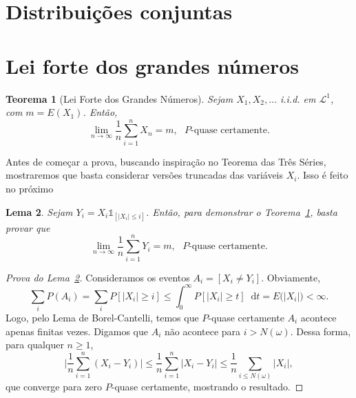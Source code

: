 \documentclass[reqno]{article}
\newcommand*\1{\mathds{1}}
\newtheorem{theorem}{Teorema}[section]
\newtheorem{lemma}[theorem]{Lema}
\renewcommand*\d{\mathop{}\!\mathrm{d}}
\begin{document}
\newpage

\section{Distribuições conjuntas}

\newpage

\section{Lei forte dos grandes números}

\begin{theorem}[Lei Forte dos Grandes Números]
  \label{t:LFGN}
  Sejam $X_1, X_2, \dots$ i.i.d. em $\mathcal{L}^1$, com $m = E(X_1)$.
  Então,
  \begin{equation}
    \lim_{n \to \infty} \frac{1}{n} \sum_{i=1}^n X_n = m, \text{ $P$-quase certamente.}
  \end{equation}
\end{theorem}

Antes de começar a prova, buscando inspiração no Teorema das Três Séries, mostraremos que basta considerar versões truncadas das variáveis $X_i$.
Isso é feito no próximo

\begin{lemma}
  \label{l:LFGN}
  Sejam $Y_i = X_i \1_{[|X_i| \leq i]}$.
  Então, para demonstrar o Teorema~\ref{t:LFGN}, basta provar que
  \begin{equation}
    \lim_{n \to \infty}\frac{1}{n} \sum_{i=1}^n Y_i = m, \text{ $P$-quase certamente.}
  \end{equation}
\end{lemma}

\begin{proof}[Prova do Lema~\ref{l:LFGN}]
  Consideramos os eventos $A_i = [X_i \neq Y_i]$.
  Obviamente,
  \begin{equation}
    \sum_i P(A_i) = \sum_i P[|X_i| \geq i] \leq \int_0^\infty P[|X_i| \geq t] \d t = E\big(|X_i|) < \infty.
  \end{equation}
  Logo, pelo Lema de Borel-Cantelli, temos que $P$-quase certamente $A_i$ acontece apenas finitas vezes.
  Digamos que $A_i$ não acontece para $i > N(\omega)$.
  Dessa forma, para qualquer $n \geq 1$,
  \begin{equation}
    \Big|\frac{1}{n}\sum_{i=1}^n (X_i - Y_i)\Big| \leq \frac{1}{n}\sum_{i=1}^n |X_i - Y_i| \leq \frac{1}{n} \sum_{i \leq N(\omega)} |X_i|,
  \end{equation}
  que converge para zero $P$-quase certamente, mostrando o resultado.
\end{proof}
\end{document}
